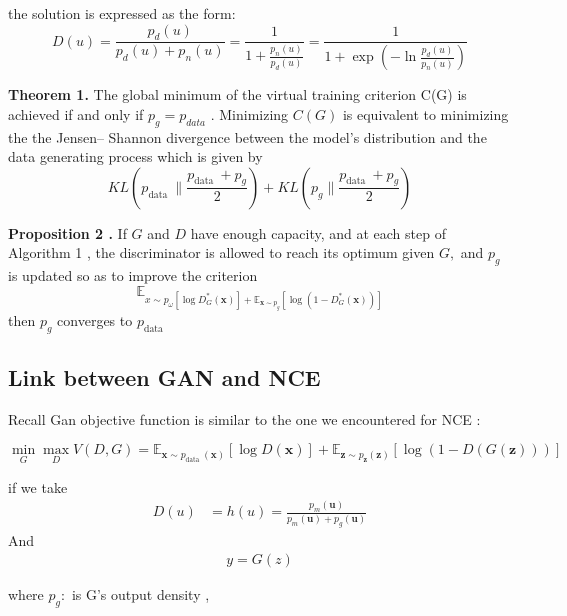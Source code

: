 \documentclass{article}
\begin{document}
the solution is expressed as the form:
$$
D(u)=\frac{p_{d}(u)}{p_{d}(u)+p_{n}(u)}=\frac{1}{1+\frac{p_{n}(u)}{p_{d}(u)}}=\frac{1}{1+\exp \left(-\ln \frac{p_{d}(u)}{p_{n}(u)}\right)}
$$


\textbf{Theorem 1.}   The global minimum of the virtual training criterion C(G) is achieved if and only if
$p_{g} = p_{data}$ .  Minimizing 	$C(G)$ is equivalent to minimizing the the Jensen–
Shannon divergence between the model’s distribution and the data generating process which is given by 
\begin{equation}K L\left(p_{\text {data }} \| \frac{p_{\text {data }}+p_{g}}{2}\right)+K L\left(p_{g} \| \frac{p_{\text {data }}+p_{g}}{2}\right)\end{equation}


\textbf{Proposition 2 .}  If $G$ and $D$ have enough capacity, and at each step of Algorithm 1 , the discriminator is allowed to reach its optimum given $G,$ and $p_{g}$ is updated so as to improve the criterion
$$
\mathbb{E}_{x \sim p_{\omega}\left[\log D_{G}^{*}(\boldsymbol{x})\right]+\mathbb{E}_{\boldsymbol{x} \sim p_{g}}\left[\log \left(1-D_{G}^{*}(\boldsymbol{x})\right)\right]}
$$
then $p_{g}$ converges to $p_{\text {data}}$



\subsection{Link between GAN and NCE}


Recall Gan  objective function  is similar to the one we encountered for NCE :


\begin{equation}
\min _{G} \max _{D} V(D, G)=\mathbb{E}_{\boldsymbol{x} \sim p_{\text {data }}(\boldsymbol{x})}[\log D(\boldsymbol{x})]+\mathbb{E}_{\boldsymbol{z} \sim p_{\boldsymbol{z}}(\boldsymbol{z})}[\log (1-D(G(\boldsymbol{z})))]
\end{equation}

 if we take
 \begin{align*}
 D(u)&= h(u) =\frac{p_{m}(\mathbf{u} )}{p_{m}(\mathbf{u} )+ p_{g}(\mathbf{u})} 
 \end{align*}
And
\begin{align*}
 y = G(z)
 \end{align*}



where $ p_{g}:$ is G's output density , \\ 
\end{document}
